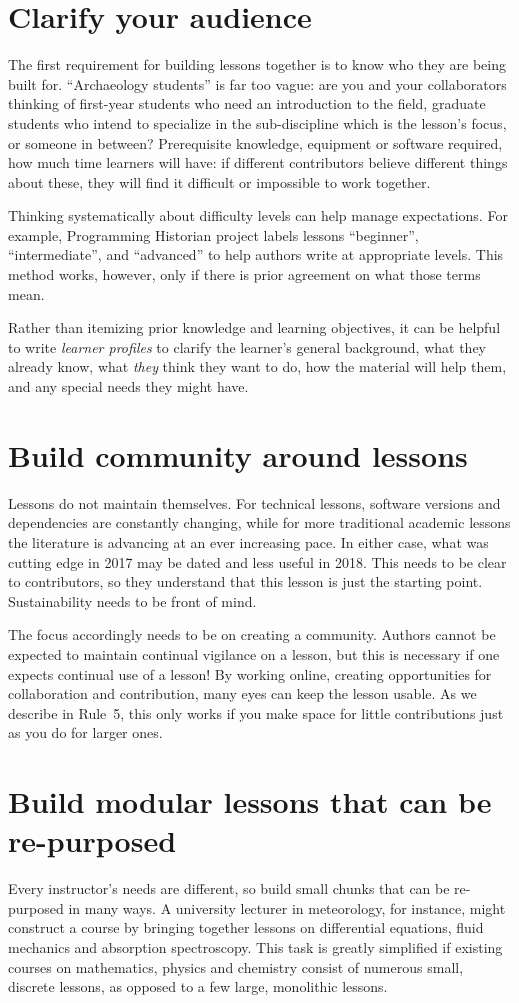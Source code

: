 \documentclass[10pt,letterpaper]{article}
\newcommand{\rulemajor}[1]{\section{#1}}
\begin{document}
\rulemajor{Clarify your audience}

The first requirement for building lessons together is
to know who they are being built for.
``Archaeology students'' is far too vague:
are you and your collaborators thinking of
first-year students who need an introduction to the field,
graduate students who intend to specialize in the sub-discipline which is the lesson's focus,
or someone in between?
Prerequisite knowledge,
equipment or software required,
how much time learners will have:
if different contributors believe different things about these,
they will find it difficult or impossible to work together.

Thinking systematically about difficulty levels can help manage expectations.
For example,
Programming Historian project labels lessons ``beginner'',
``intermediate'',
and ``advanced''
to help authors write at appropriate levels.
This method works, however, only if there is prior agreement on what those terms mean.

Rather than itemizing prior knowledge and learning objectives,
it can be helpful to write \emph{learner profiles} to clarify
the learner's general background,
what they already know,
what \emph{they} think they want to do,
how the material will help them,
and any special needs they might have.

\rulemajor{Build community around lessons}

Lessons do not maintain themselves.
For technical lessons, software versions and dependencies are constantly changing,
while for more traditional academic lessons the literature is advancing at an ever increasing pace.
In either case, what was cutting edge in 2017 may be dated
and less useful in 2018.
This needs to be clear to contributors,
so they understand that this lesson is just
the starting point.
Sustainability needs to be front of mind.

The focus accordingly needs to be on creating a community.
Authors cannot be expected to maintain continual vigilance on a lesson,
but this is necessary if one expects continual use of a lesson!
By working online, creating opportunities for collaboration
and contribution, many eyes can keep the lesson usable.
As we describe in Rule~5,
this only works if you make space for
little contributions just as you do for larger ones.

\rulemajor{Build modular lessons that can be re-purposed}

Every instructor's needs are different,
so build small chunks that can be re-purposed in many ways.
A university lecturer in meteorology, for instance,
might construct a course by bringing together lessons on differential equations,
fluid mechanics and absorption spectroscopy.
This task is greatly simplified if existing courses on mathematics,
physics and chemistry consist of numerous small, discrete lessons,
as opposed to a few large, monolithic lessons.
\end{document}
